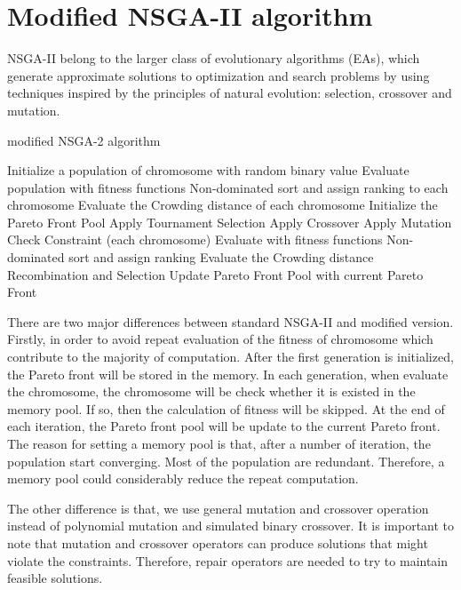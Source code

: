 \documentclass{llncs}
\begin{document}
\section{Modified NSGA-II algorithm}
\label{sec:algorithm_des}
NSGA-II belong to the larger class of evolutionary algorithms (EAs), which generate approximate solutions to 
optimization and search problems by using techniques inspired by the principles of natural 
evolution: selection, crossover and mutation.

\begin{algorithm}
	\caption{modified NSGA-2 algorithm}
	\label{NSGA2}
	\begin{algorithmic}[1]
		\State Initialize a population of chromosome with random binary value
		\State Evaluate population with fitness functions
		\State Non-dominated sort and assign ranking to each chromosome
		\State Evaluate the Crowding distance of each chromosome
		\State Initialize the Pareto Front Pool
		\State Apply Tournament Selection
		\State Apply Crossover 
		\State Apply Mutation
		\State Check Constraint
		\For(each chromosome)
		\State Evaluate with fitness functions
		\EndIf
		\State Non-dominated sort and assign ranking
		\State Evaluate the Crowding distance
		\EndFor
		\State Recombination and Selection
		\State Update Pareto Front Pool with current Pareto Front
		\EndWhile
	\end{algorithmic}
\end{algorithm}

There are two major differences between standard NSGA-II and modified version. Firstly, in order to avoid repeat evaluation of the fitness
of chromosome which contribute to the majority of computation. After the first generation is initialized, the Pareto front will be 
stored in the memory. In each generation, when evaluate the chromosome, the chromosome will be check whether it is existed in the memory pool. 
If so, then the calculation of fitness will be skipped. At the end of each iteration, the Pareto front pool will be update to the current Pareto front.
The reason for setting a memory pool is that, after a number of iteration, the population start converging. 
Most of the population are redundant. Therefore, a memory pool could considerably reduce the repeat computation.

The other difference is that, we use general mutation and crossover operation instead of polynomial mutation and simulated binary crossover.
It is important to note that mutation and crossover operators can produce solutions that might violate the constraints. 
Therefore, repair operators are needed to try to maintain feasible solutions.
\end{document}
